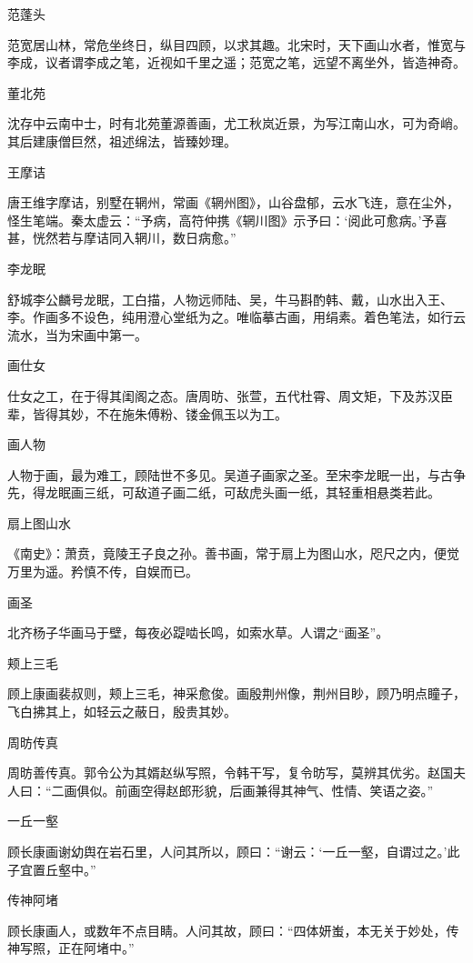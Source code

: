 \documentclass[a4paper,12pt,UTF8,twoside]{ctexbook}
\begin{document}
    范蓬头
    
    范宽居山林，常危坐终日，纵目四顾，以求其趣。北宋时，天下画山水者，惟宽与李成，议者谓李成之笔，近视如千里之遥；范宽之笔，远望不离坐外，皆造神奇。
    
    董北苑
    
    沈存中云南中士，时有北苑董源善画，尤工秋岚近景，为写江南山水，可为奇峭。其后建康僧巨然，祖述绵法，皆臻妙理。
    
    王摩诘
    
    唐王维字摩诘，别墅在辋州，常画《辋州图》，山谷盘郁，云水飞连，意在尘外，怪生笔端。秦太虚云：“予病，高符仲携《辋川图》示予曰：‘阅此可愈病。’予喜甚，恍然若与摩诘同入辋川，数日病愈。”
    
    李龙眠
    
    舒城李公麟号龙眠，工白描，人物远师陆、吴，牛马斟酌韩、戴，山水出入王、李。作画多不设色，纯用澄心堂纸为之。唯临摹古画，用绢素。着色笔法，如行云流水，当为宋画中第一。
    
    画仕女
    
    仕女之工，在于得其闺阁之态。唐周昉、张萱，五代杜霄、周文矩，下及苏汉臣辈，皆得其妙，不在施朱傅粉、镂金佩玉以为工。
    
    画人物
    
    人物于画，最为难工，顾陆世不多见。吴道子画家之圣。至宋李龙眠一出，与古争先，得龙眠画三纸，可敌道子画二纸，可敌虎头画一纸，其轻重相悬类若此。
    
    扇上图山水
    
    《南史》：萧贲，竟陵王子良之孙。善书画，常于扇上为图山水，咫尺之内，便觉万里为遥。矜慎不传，自娱而已。
    
    画圣
    
    北齐杨子华画马于壁，每夜必踶啮长鸣，如索水草。人谓之“画圣”。
    
    颊上三毛
    
    顾上康画裴叔则，颊上三毛，神采愈俊。画殷荆州像，荆州目眇，顾乃明点瞳子，飞白拂其上，如轻云之蔽日，殷贵其妙。
    
    周昉传真
    
    周昉善传真。郭令公为其婿赵纵写照，令韩干写，复令昉写，莫辨其优劣。赵国夫人曰：“二画俱似。前画空得赵郎形貌，后画兼得其神气、性情、笑语之姿。”
    
    一丘一壑
    
    顾长康画谢幼舆在岩石里，人问其所以，顾曰：“谢云：‘一丘一壑，自谓过之。’此子宜置丘壑中。”
    
    传神阿堵
    
    顾长康画人，或数年不点目睛。人问其故，顾曰：“四体妍蚩，本无关于妙处，传神写照，正在阿堵中。”
    
\end{document}
